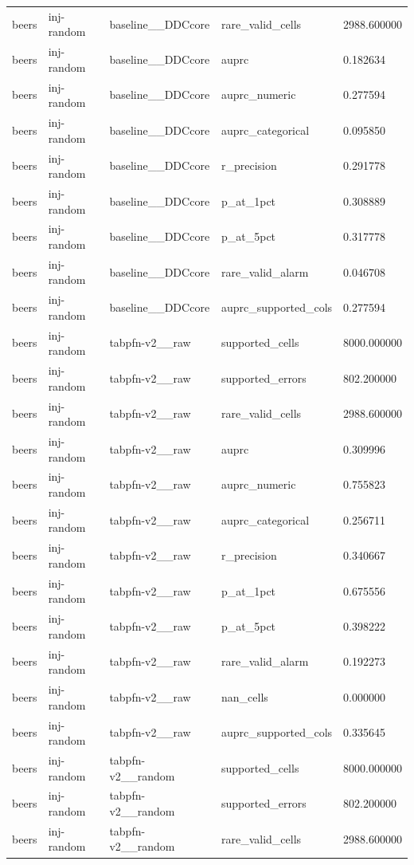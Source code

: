 \begin{tabular}{lllll}
beers & inj-random & baseline\_\_DDCcore & rare\_valid\_cells & 2988.600000 \\
beers & inj-random & baseline\_\_DDCcore & auprc & 0.182634 \\
beers & inj-random & baseline\_\_DDCcore & auprc\_numeric & 0.277594 \\
beers & inj-random & baseline\_\_DDCcore & auprc\_categorical & 0.095850 \\
beers & inj-random & baseline\_\_DDCcore & r\_precision & 0.291778 \\
beers & inj-random & baseline\_\_DDCcore & p\_at\_1pct & 0.308889 \\
beers & inj-random & baseline\_\_DDCcore & p\_at\_5pct & 0.317778 \\
beers & inj-random & baseline\_\_DDCcore & rare\_valid\_alarm & 0.046708 \\
beers & inj-random & baseline\_\_DDCcore & auprc\_supported\_cols & 0.277594 \\
beers & inj-random & tabpfn-v2\_\_raw & supported\_cells & 8000.000000 \\
beers & inj-random & tabpfn-v2\_\_raw & supported\_errors & 802.200000 \\
beers & inj-random & tabpfn-v2\_\_raw & rare\_valid\_cells & 2988.600000 \\
beers & inj-random & tabpfn-v2\_\_raw & auprc & 0.309996 \\
beers & inj-random & tabpfn-v2\_\_raw & auprc\_numeric & 0.755823 \\
beers & inj-random & tabpfn-v2\_\_raw & auprc\_categorical & 0.256711 \\
beers & inj-random & tabpfn-v2\_\_raw & r\_precision & 0.340667 \\
beers & inj-random & tabpfn-v2\_\_raw & p\_at\_1pct & 0.675556 \\
beers & inj-random & tabpfn-v2\_\_raw & p\_at\_5pct & 0.398222 \\
beers & inj-random & tabpfn-v2\_\_raw & rare\_valid\_alarm & 0.192273 \\
beers & inj-random & tabpfn-v2\_\_raw & nan\_cells & 0.000000 \\
beers & inj-random & tabpfn-v2\_\_raw & auprc\_supported\_cols & 0.335645 \\
beers & inj-random & tabpfn-v2\_\_random & supported\_cells & 8000.000000 \\
beers & inj-random & tabpfn-v2\_\_random & supported\_errors & 802.200000 \\
beers & inj-random & tabpfn-v2\_\_random & rare\_valid\_cells & 2988.600000 \\

\end{tabular}
